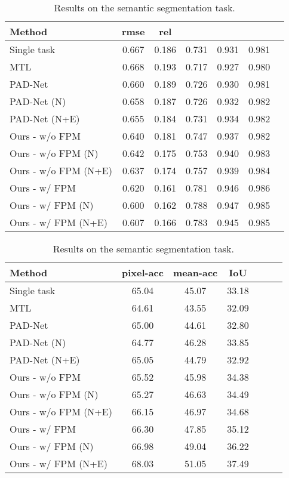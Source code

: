 \documentclass[runningheads]{llncs}
\begin{document}
\begin{table}[t]
    \caption{Ablation studies on NYUD-v2 using an HRNet18-V2 backbone. Auxiliary tasks are indicated in brackets.}
    \label{tab: supplementary_nyu}
    \begin{subtable}{1.0\linewidth}
    \centering
    \caption{Results on the depth estimation task.}
    \label{tab: nyu_depth}
    \footnotesize{\begin{tabular}{|l|c|c|c|c|c|c|}
\hline
Method & rmse  & rel  &  &  &  \\
\hline
Single task & 0.667 & 0.186 & 0.731 & 0.931 & 0.981 \\
MTL & 0.668 & 0.193 & 0.717 & 0.927 & 0.980 \\
PAD-Net & 0.660 & 0.189 & 0.726 & 0.930 & 0.981 \\
PAD-Net (N) & 0.658 & 0.187 & 0.726 & 0.932 & 0.982 \\
PAD-Net (N+E) & 0.655 & 0.184 & 0.731 & 0.934 & 0.982 \\
\hline
Ours - w/o FPM & 0.640 & 0.181 & 0.747 & 0.937 & 0.982 \\
Ours - w/o FPM (N) & 0.642 & 0.175 & 0.753 & 0.940 & 0.983 \\
Ours - w/o FPM (N+E) & 0.637 & 0.174 & 0.757 & 0.939 & 0.984 \\
\hline
Ours - w/ FPM & 0.620 & 0.161 & 0.781 & 0.946 & 0.986 \\
Ours - w/ FPM (N) & 0.600 & 0.162 & 0.788 & 0.947 & 0.985 \\
Ours - w/ FPM (N+E) & 0.607 & 0.166 & 0.783 & 0.945 & 0.985 \\
\hline
\end{tabular}}
    \end{subtable}

    \bigskip
   
\begin{subtable}{1.0\linewidth} 
\centering
\caption{Results on the semantic segmentation task.}
\label{tab: pascal_resnet50}
\footnotesize{
\begin{tabular}{|l|c|c|c|c|c|c|}
\hline
Method & pixel-acc  & mean-acc  & IoU   \\
\hline
Single task & 65.04 & 45.07 & 33.18 \\
MTL & 64.61 & 43.55 & 32.09 \\
PAD-Net & 65.00 & 44.61 & 32.80 \\
PAD-Net (N) & 64.77 & 46.28 & 33.85 \\
PAD-Net (N+E) & 65.05 & 44.79 & 32.92 \\
\hline
Ours - w/o FPM & 65.52 & 45.98 & 34.38 \\
Ours - w/o FPM (N) & 65.27 & 46.63 & 34.49 \\
Ours - w/o FPM (N+E) & 66.15 & 46.97 & 34.68 \\
\hline
Ours - w/ FPM & 66.30 & 47.85 & 35.12 \\
Ours - w/ FPM (N) & 66.98 & 49.04 & 36.22 \\
Ours - w/ FPM (N+E) & 68.03 & 51.05 & 37.49 \\
\hline
\end{tabular}}
\end{subtable}\end{table}
\end{document}
